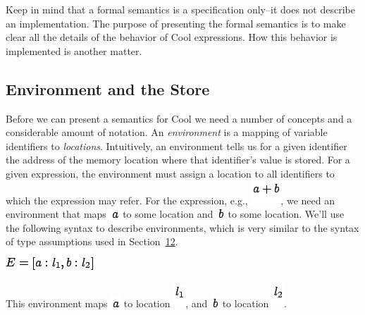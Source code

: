 \documentclass[]{article}
\begin{document}
Keep in mind that a formal semantics is a specification only--it does
not describe an implementation. The purpose of presenting the formal
semantics is to make clear all the details of the behavior of Cool
expressions. How this behavior is implemented is another matter.

\subsection{Environment and the Store}

Before we can present a semantics for Cool we need a number of concepts
and a considerable amount of notation. An \emph{environment} is a
mapping of variable identifiers to \emph{locations}. Intuitively, an
environment tells us for a given identifier the address of the memory
location where that identifier's value is stored. For a given
expression, the environment must assign a location to all identifiers to
which the expression may refer. For the expression, e.g.,
\includegraphics{img115.png}, we need an environment that maps
\includegraphics{img30.png} to some location and
\includegraphics{img116.png} to some location. We'll use the following
syntax to describe environments, which is very similar to the syntax of
type assumptions used in Section~\href{node41.html\#sec-typrules}{12}.
\\

\includegraphics{img117.png}

This environment maps \includegraphics{img30.png} to location
\includegraphics{img118.png}, and \includegraphics{img116.png} to
location \includegraphics{img119.png}.
\end{document}
